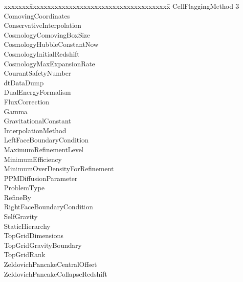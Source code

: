 \documentclass{book}
\begin{document}
{\parametersize
\begin{tabbing}
xxxxxxx\=xxxxxxxxxxxxxxxxxxxxxxxxxxxxxxxxxxxxxxx\=\kill
\> CellFlaggingMethod         3     \\
\> ComovingCoordinates                \\
\> ConservativeInterpolation  \\
\> CosmologyComovingBoxSize        \\
\> CosmologyHubbleConstantNow  \\
\> CosmologyInitialRedshift          \\
\> CosmologyMaxExpansionRate       \\
\> CourantSafetyNumber     \\
\> dtDataDump              \\
\> DualEnergyFormalism            \\
\> FluxCorrection             \\
\> Gamma                   \\
\> GravitationalConstant              \\
\> InterpolationMethod        \\
\> LeftFaceBoundaryCondition          \\
\> MaximumRefinementLevel         \\
\> MinimumEfficiency            \\
\> MinimumOverDensityForRefinement     \\
\> PPMDiffusionParameter          \\
\> ProblemType                       \\
\> RefineBy                       \\
\> RightFaceBoundaryCondition  \\
\> SelfGravity                        \\
\> StaticHierarchy                \\
\> TopGridDimensions           \\
\> TopGridGravityBoundary             \\
\> TopGridRank                 \\
\> ZeldovichPancakeCentralOffset     \\
\> ZeldovichPancakeCollapseRedshift 
\end{tabbing}}

\end{document}
